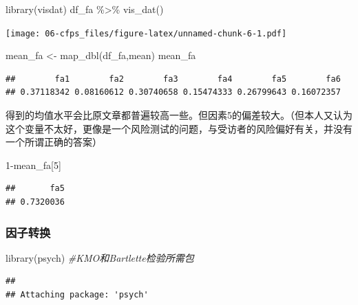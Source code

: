 \documentclass[
  oneside]{book}
\newenvironment{Shaded}{\begin{snugshade}}{\end{snugshade}}
\newcommand{\CommentTok}[1]{\textcolor[rgb]{0.56,0.35,0.01}{\textit{#1}}}
\newcommand{\DecValTok}[1]{\textcolor[rgb]{0.00,0.00,0.81}{#1}}
\newcommand{\FunctionTok}[1]{\textcolor[rgb]{0.00,0.00,0.00}{#1}}
\newcommand{\NormalTok}[1]{#1}
\newcommand{\OtherTok}[1]{\textcolor[rgb]{0.56,0.35,0.01}{#1}}
\newcommand{\SpecialCharTok}[1]{\textcolor[rgb]{0.00,0.00,0.00}{#1}}
\begin{document}
\begin{Shaded}
\begin{Highlighting}[]
\FunctionTok{library}\NormalTok{(visdat)}
\NormalTok{df\_fa }\SpecialCharTok{\%\textgreater{}\%}
  \FunctionTok{vis\_dat}\NormalTok{()}
\end{Highlighting}
\end{Shaded}

\texttt{[image: 06-cfps\_files/figure-latex/unnamed-chunk-6-1.pdf]}

\begin{Shaded}
\begin{Highlighting}[]
\NormalTok{mean\_fa }\OtherTok{\textless{}{-}} \FunctionTok{map\_dbl}\NormalTok{(df\_fa,mean)}
\NormalTok{mean\_fa}
\end{Highlighting}
\end{Shaded}

\begin{verbatim}
##        fa1        fa2        fa3        fa4        fa5        fa6 
## 0.37118342 0.08160612 0.30740658 0.15474333 0.26799643 0.16072357
\end{verbatim}

得到的均值水平会比原文章都普遍较高一些。但因素5的偏差较大。（但本人又认为这个变量不太好，更像是一个风险测试的问题，与受访者的风险偏好有关，并没有一个所谓正确的答案）

\begin{Shaded}
\begin{Highlighting}[]
\DecValTok{1}\SpecialCharTok{{-}}\NormalTok{mean\_fa[}\DecValTok{5}\NormalTok{]}
\end{Highlighting}
\end{Shaded}

\begin{verbatim}
##       fa5 
## 0.7320036
\end{verbatim}

\hypertarget{ux56e0ux5b50ux8f6cux6362}{%
\subsubsection{因子转换}\label{ux56e0ux5b50ux8f6cux6362}}

\begin{Shaded}
\begin{Highlighting}[]
\FunctionTok{library}\NormalTok{(psych) }\CommentTok{\#KMO和Bartlette检验所需包}
\end{Highlighting}
\end{Shaded}

\begin{verbatim}
## 
## Attaching package: 'psych'
\end{verbatim}
\end{document}
